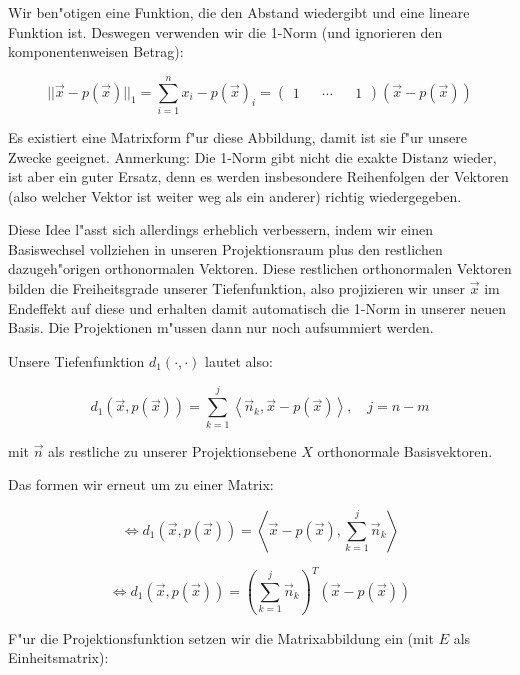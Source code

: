 \documentclass{article}
\newcommand{\lrangle}[1]{\left\langle #1 \right\rangle}
\begin{document}
Wir ben"otigen eine Funktion, die den Abstand wiedergibt und eine lineare
Funktion ist. Deswegen verwenden wir die 1-Norm (und ignorieren den
komponentenweisen Betrag):

    \begin{equation}
        ||\vec{x} - p(\vec{x})||_1 = \sum_{i=1}^{n}{x_i - p(\vec{x})_i} =
        \begin{pmatrix} 1 && \cdots && 1 \end{pmatrix} (\vec{x} - p(\vec{x}))
    \end{equation}

Es existiert eine Matrixform f"ur diese Abbildung, damit ist sie f"ur unsere
Zwecke geeignet. Anmerkung: Die 1-Norm gibt nicht die exakte Distanz wieder, ist
aber ein guter Ersatz, denn es werden insbesondere Reihenfolgen der Vektoren
(also welcher Vektor ist weiter weg als ein anderer) richtig wiedergegeben.

Diese Idee l"asst sich allerdings erheblich verbessern, indem wir einen
Basiswechsel vollziehen in unseren Projektionsraum plus den restlichen
dazugeh"origen orthonormalen Vektoren. Diese restlichen orthonormalen Vektoren
bilden die Freiheitsgrade unserer Tiefenfunktion, also projizieren wir unser
\(\vec{x}\) im Endeffekt auf diese und erhalten damit automatisch die 1-Norm in
unserer neuen Basis. Die Projektionen m"ussen dann nur noch aufsummiert werden.

Unsere Tiefenfunktion \(d_1(\cdot,\cdot)\) lautet also:

    \begin{equation}
        d_1(\vec{x}, p(\vec{x})) = \sum_{k=1}^{j}{\lrangle{ \vec{n}_k, \vec{x}
        - p(\vec{x}) }}, \quad j = n -m
    \end{equation}

mit \(\vec{n}\) als restliche zu unserer Projektionsebene \(X\) orthonormale
Basisvektoren.

Das formen wir erneut um zu einer Matrix:

    \begin{equation}
        \iff d_1(\vec{x}, p(\vec{x})) = \lrangle{ \vec{x} - p(\vec{x}),
        \sum_{k=1}^{j}{\vec{n}_k} }
    \end{equation}

    \begin{equation}
        \iff d_1(\vec{x}, p(\vec{x})) = (\sum_{k=1}^{j}{\vec{n}_k})^T
        (\vec{x} - p(\vec{x}))
    \end{equation}

F"ur die Projektionsfunktion setzen wir die Matrixabbildung ein (mit \(E\) als
Einheitsmatrix):
\end{document}
